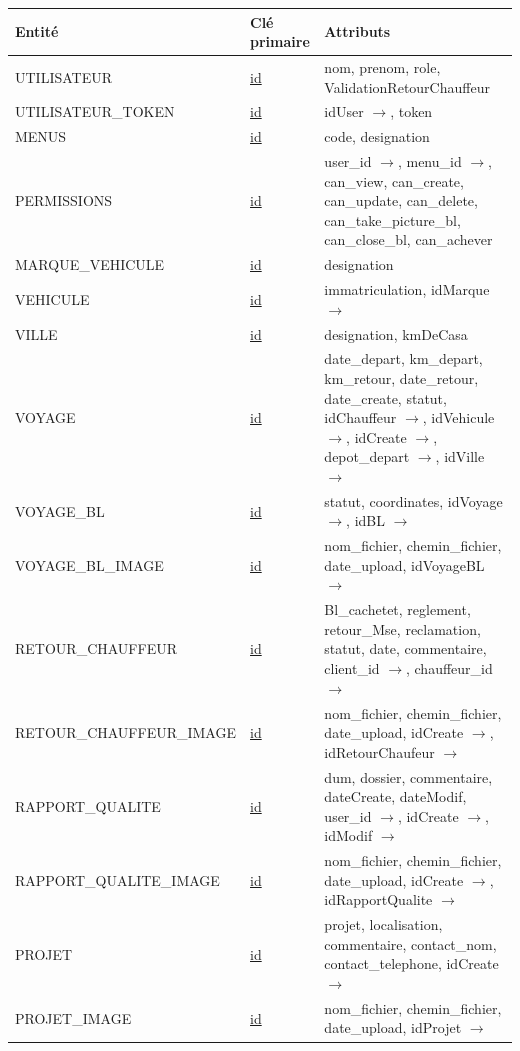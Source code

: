 \documentclass[12pt,a4paper]{article}
\begin{document}
\begin{center}
\renewcommand{\arraystretch}{1.2}
\begin{tabular}{|p{3.2cm}|p{2cm}|p{8cm}|}
\hline
\textbf{Entité} & \textbf{Clé primaire} & \textbf{Attributs} \\
\hline
UTILISATEUR & \underline{id} & nom, prenom, role, ValidationRetourChauffeur \\
\hline
UTILISATEUR\_TOKEN & \underline{id} & idUser $\to$, token \\
\hline
MENUS & \underline{id} & code, designation \\
\hline
PERMISSIONS & \underline{id} & user\_id $\to$, menu\_id $\to$, can\_view, can\_create, can\_update, can\_delete, can\_take\_picture\_bl, can\_close\_bl, can\_achever \\
\hline
MARQUE\_VEHICULE & \underline{id} & designation \\
\hline
VEHICULE & \underline{id} & immatriculation, idMarque $\to$ \\
\hline
VILLE & \underline{id} & designation, kmDeCasa \\
\hline
VOYAGE & \underline{id} & date\_depart, km\_depart, km\_retour, date\_retour, date\_create, statut, idChauffeur $\to$, idVehicule $\to$, idCreate $\to$, depot\_depart $\to$, idVille $\to$ \\
\hline
VOYAGE\_BL & \underline{id} & statut, coordinates, idVoyage $\to$, idBL $\to$ \\
\hline
VOYAGE\_BL\_IMAGE & \underline{id} & nom\_fichier, chemin\_fichier, date\_upload, idVoyageBL $\to$ \\
\hline
RETOUR\_CHAUFFEUR & \underline{id} & Bl\_cachetet, reglement, retour\_Mse, reclamation, statut, date, commentaire, client\_id $\to$, chauffeur\_id $\to$ \\
\hline
RETOUR\_CHAUFFEUR\_IMAGE & \underline{id} & nom\_fichier, chemin\_fichier, date\_upload, idCreate $\to$, idRetourChaufeur $\to$ \\
\hline
RAPPORT\_QUALITE & \underline{id} & dum, dossier, commentaire, dateCreate, dateModif, user\_id $\to$, idCreate $\to$, idModif $\to$ \\
\hline
RAPPORT\_QUALITE\_IMAGE & \underline{id} & nom\_fichier, chemin\_fichier, date\_upload, idCreate $\to$, idRapportQualite $\to$ \\
\hline
PROJET & \underline{id} & projet, localisation, commentaire, contact\_nom, contact\_telephone, idCreate $\to$ \\
\hline
PROJET\_IMAGE & \underline{id} & nom\_fichier, chemin\_fichier, date\_upload, idProjet $\to$ \\

\end{tabular}
\end{center}
\end{document}
